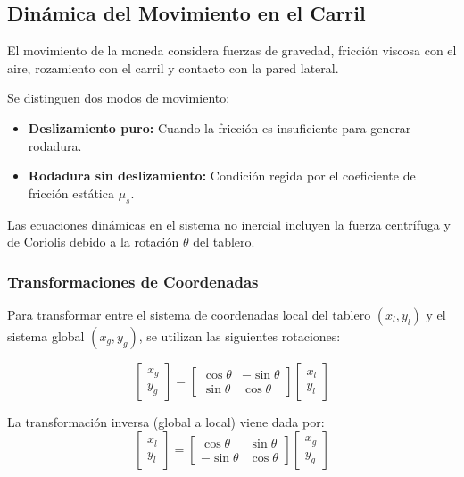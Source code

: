 \documentclass[
A4paper,            1 paper size A4
oneside,            %
openright,          %
10pt,               %
headings=normal,    %
titlepage=on        %
]{article}
\begin{document}
\subsection{Dinámica del Movimiento en el Carril}
El movimiento de la moneda considera fuerzas de gravedad, fricción viscosa con el aire, rozamiento con el carril y contacto con la pared lateral.

Se distinguen dos modos de movimiento:
\begin{itemize}
    \item \textbf{Deslizamiento puro:} Cuando la fricción es insuficiente para generar rodadura.
    \item \textbf{Rodadura sin deslizamiento:} Condición regida por el coeficiente de fricción estática $\mu_s$.
\end{itemize}

Las ecuaciones dinámicas en el sistema no inercial incluyen la fuerza centrífuga y de Coriolis debido a la rotación $\theta$ del tablero.

\subsubsection{Transformaciones de Coordenadas}
Para transformar entre el sistema de coordenadas local del tablero $(x_l, y_l)$ y el sistema global $(x_g, y_g)$, se utilizan las siguientes rotaciones:

\begin{equation}
    \begin{bmatrix} x_g \\ y_g \end{bmatrix} = \begin{bmatrix} \cos\theta & -\sin\theta \\ \sin\theta & \cos\theta \end{bmatrix} \begin{bmatrix} x_l \\ y_l \end{bmatrix}
\end{equation}

La transformación inversa (global a local) viene dada por:
\begin{equation}
    \begin{bmatrix} x_l \\ y_l \end{bmatrix} = \begin{bmatrix} \cos\theta & \sin\theta \\ -\sin\theta & \cos\theta \end{bmatrix} \begin{bmatrix} x_g \\ y_g \end{bmatrix}
\end{equation}
\end{document}
